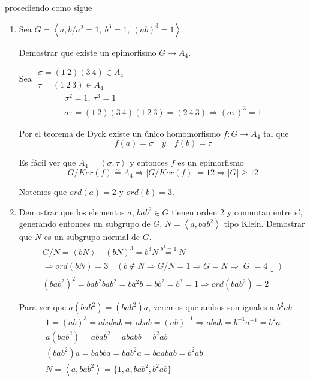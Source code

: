 \documentclass{article}
\begin{document}
procediendo como sigue
\begin{enumerate}[(1)]
\item Sea $G=\left\langle a,b/a^2=1,\:b^3=1,\:(ab)^3=1\right\rangle$.

Demostrar que existe un epimorfismo $G\longrightarrow A_4$.

Sea $\left.\begin{array}{c}
\sigma =(1\:2)(3\:4)\in A_4\\
\tau=(1\:2\:3)\in A_4
\end{array}\right.$
\begin{gather*}
\sigma^2=1,\:\tau^3=1\\
\sigma\tau=(1\:2)(3\:4)(1\:2\:3)=(2\:4\:3)\Rightarrow (\sigma\tau)^3=1
\end{gather*}

Por el teorema de Dyck existe un único homomorfismo $f:G\longrightarrow A_4$ tal que
\begin{equation*}
f(a)=\sigma \quad y\quad f(b)=\tau
\end{equation*}

Es fácil ver que $A_4=\left\langle\sigma,\tau\right\rangle$ y entonces $f$ es un epimorfismo
\begin{equation*}
G/Ker(f)\overset{\sim}{=}A_4\Rightarrow |G/Ker(f)|=12\Rightarrow |G|\geq 12
\end{equation*}

Notemos que $ord(a)=2$ y $ord(b)=3$.

\item Demostrar que los elementos $a,\,bab^2\in G$ tienen orden 2 y conmutan entre sí, generando entonces un subgrupo de $G$, $N=\left\langle a,bab^2\right\rangle$ tipo Klein. Demostrar que $N$ es un subgrupo normal de $G$.
\begin{gather*}
G/N=\left\langle bN\right\rangle\quad (bN)^3=b^3N\overset{b^3=1}{=} N \\
\Rightarrow ord(bN)=3\quad (b\notin N\Rightarrow G/N=1\Rightarrow G=N\Rightarrow |G|=4\downarrow) \\
(bab^2)^2=bab^2bab^2=ba^2b=bb^2=b^3=1\Rightarrow ord(bab^2)=2
\end{gather*}

Para ver que $a(bab^2)=(bab^2)a$, veremos que ambos son iguales a $b^2ab$
\begin{gather*}
1=(ab)^3=ababab\Rightarrow abab=(ab)^{-1}\Rightarrow abab=b^{-1}a^{-1}=b^2a\\
a(bab^2)=abab^2=ababb=b^2ab\\
(bab^2)a=babba=bab^2a=baabab=b^2ab\\
N=\left\langle a, bab^2\right\rangle =\{1,a,bab^2,b^2ab\}
\end{gather*}


\end{enumerate}
\end{document}
